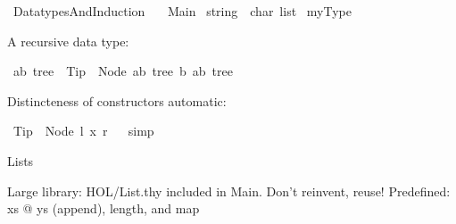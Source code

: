 %
\begin{isabellebody}%
%
%
\isadelimtheory
%
\endisadelimtheory
%
\isatagtheory
{}\isamarkupfalse%
\ DatatypesAndInduction\isanewline
\ \ \ Main\isanewline
{}%
\endisatagtheory
{\isafoldtheory}%
%
\isadelimtheory
%
\endisadelimtheory
%
\isadelimdocument
%
\endisadelimdocument
%
\isatagdocument
%
\isamarkuptrue%
%
\endisatagdocument
{\isafolddocument}%
%
\isadelimdocument
%
\endisadelimdocument
{}\isamarkupfalse%
\ string\ {\isacharequal}{\kern0pt}\ {\isachardoublequoteopen}char\ list{\isachardoublequoteclose}\isanewline
\isanewline
{}\isamarkupfalse%
\ myType%
\begin{isamarkuptext}%
A recursive data type:%
\end{isamarkuptext}\isamarkuptrue%
\isamarkupfalse%
\ {\isacharparenleft}{\kern0pt}{\isacharprime}{\kern0pt}a{\isacharcomma}{\kern0pt}{\isacharprime}{\kern0pt}b{\isacharparenright}{\kern0pt}\ tree\ {\isacharequal}{\kern0pt}\ Tip\ {\isacharbar}{\kern0pt}\ Node\ {\isachardoublequoteopen}{\isacharparenleft}{\kern0pt}{\isacharprime}{\kern0pt}a{\isacharcomma}{\kern0pt}{\isacharprime}{\kern0pt}b{\isacharparenright}{\kern0pt}\ tree{\isachardoublequoteclose}\ {\isacharprime}{\kern0pt}b\ {\isachardoublequoteopen}{\isacharparenleft}{\kern0pt}{\isacharprime}{\kern0pt}a{\isacharcomma}{\kern0pt}{\isacharprime}{\kern0pt}b{\isacharparenright}{\kern0pt}\ tree{\isachardoublequoteclose}\isanewline
\isanewline
{}\isamarkupfalse%
%
\begin{isamarkuptext}%
Distincteness of constructors automatic:%
\end{isamarkuptext}\isamarkuptrue%
\isamarkupfalse%
\ {\isachardoublequoteopen}Tip\ {\isachartilde}{\kern0pt}{\isacharequal}{\kern0pt}\ Node\ l\ x\ r{\isachardoublequoteclose}%
\isadelimproof
\ %
\endisadelimproof
%
\isatagproof
{}\isamarkupfalse%
\ simp%
\endisatagproof
{\isafoldproof}%
%
\isadelimproof
%
\endisadelimproof
%
\begin{isamarkuptext}%
Lists%
\end{isamarkuptext}\isamarkuptrue%
%
\begin{isamarkuptext}%
Large library: HOL/List.thy included in Main. Don’t reinvent, reuse!
Predefined: xs @ ys (append), length, and map%
\end{isamarkuptext}\isamarkuptrue%

\end{isabellebody}
